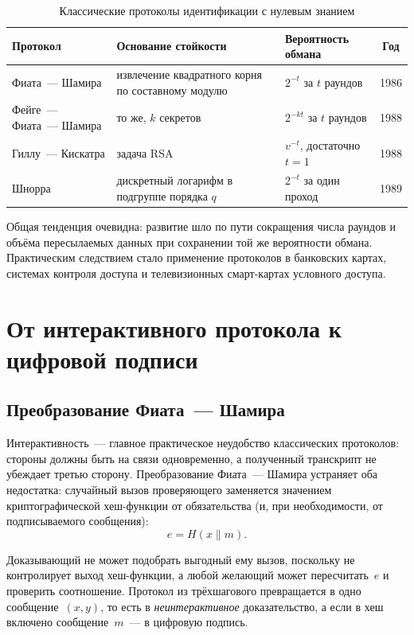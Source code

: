 \documentclass[14pt,a4paper]{extarticle}
\begin{document}
\begin{table}[H]
\caption{Классические протоколы идентификации с нулевым знанием}
\label{tab:classic}
\centering
\small
\setlength{\tabcolsep}{5pt}
\begin{tabularx}{\textwidth}{>{\raggedright\arraybackslash}p{3.8cm}X>{\raggedright\arraybackslash}p{3.5cm}c}
\toprule
Протокол & Основание стойкости & Вероятность обмана & Год \\
\midrule
Фиата~--- Шамира & извлечение квадратного корня по составному модулю & $2^{-t}$ за $t$ раундов & 1986 \\
Фейге~--- Фиата~--- Шамира & то же, $k$ секретов & $2^{-kt}$ за $t$ раундов & 1988 \\
Гиллу~--- Кискатра & задача RSA & $v^{-t}$, достаточно $t = 1$ & 1988 \\
Шнорра & дискретный логарифм в подгруппе порядка $q$ & $2^{-t}$ за один проход & 1989 \\
\bottomrule
\end{tabularx}
\end{table}

Общая тенденция очевидна: развитие шло по пути сокращения числа раундов и объёма
пересылаемых данных при сохранении той же вероятности обмана. Практическим следствием
стало применение протоколов в банковских картах, системах контроля доступа и
телевизионных смарт-картах условного доступа.

\section{От интерактивного протокола к цифровой подписи}

\subsection{Преобразование Фиата~--- Шамира}

Интерактивность~--- главное практическое неудобство классических протоколов: стороны
должны быть на связи одновременно, а полученный транскрипт не убеждает третью сторону.
Преобразование Фиата~--- Шамира устраняет оба недостатка: случайный вызов проверяющего
заменяется значением криптографической хеш-функции от обязательства (и, при
необходимости, от подписываемого сообщения):
\begin{equation}
e = H(x \parallel m).
\end{equation}

Доказывающий не может подобрать выгодный ему вызов, поскольку не контролирует выход
хеш-функции, а любой желающий может пересчитать~$e$ и проверить соотношение. Протокол
из трёхшагового превращается в одно сообщение~$(x, y)$, то есть в
\emph{неинтерактивное} доказательство, а если в хеш включено сообщение~$m$~--- в
цифровую подпись.
\end{document}

